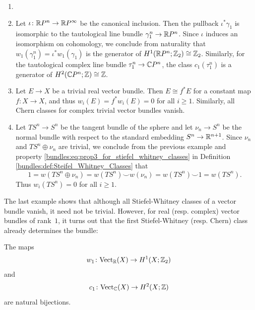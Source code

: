 \begin{example}
    \label{bundles:ex:characteristic_classes}
    \begin{enumerate}[label=(\roman*)]
        \item[]
        \item \vspace{-.5em} \label{bundles:ex:characteristic_classes_part1} Let $\iota \colon \mathbb{R} P^n \to \mathbb{R} P^\infty$ be the canonical inclusion. Then the pullback $\iota^\ast \gamma_1$ is isomorphic to the tautological line bundle $\gamma_1^n \to \mathbb{R} P^n$. Since $\iota$ induces an isomorphism on cohomology, we conclude from naturality that $w_1(\gamma_1^n) = \iota^\ast w_1(\gamma_1)$ is the generator of $H^1(\mathbb{R} P^n;\mathbb{Z}_2) \cong \mathbb{Z}_2$. Similarly, for the tautological complex line bundle $\tau_1^n \to \mathbb{C} P^n$, the class $c_1(\tau_1^n)$ is a generator of $H^2(\mathbb{C} P^n;\mathbb{Z}) \cong \mathbb{Z}$.
        \item Let $E \to X$ be a trivial real vector bundle. Then $E \cong f^\ast E$ for a constant map $f \colon X \to X$, and thus $w_i(E) = f^\ast w_i(E) = 0$ for all $i \geq 1$. Similarly, all Chern classes for complex trivial vector bundles vanish.
        \item \label{bundles:ex:characteristic_classes_part3} Let $TS^n \to S^n$ be the tangent bundle of the sphere and let $\nu_n \to S^n$ be the normal bundle with respect to the standard embedding $S^n \to \mathbb{R}^{n+1}$. Since $\nu_n$ and $TS^n \oplus \nu_n$ are trivial, we conclude from the previous example and property \ref{bundles:eq:prop3_for_stiefel_whitney_classes} in Definition \ref{bundles:def:Steifel_Whitney_Classes} that 
        \[
        1 = w(TS^n \oplus \nu_n) = w(TS^n) \smile w(\nu_n) = w(TS^n) \smile 1 = w(TS^n).
        \]
        Thus $w_i(TS^n) = 0$ for all $i \geq 1$.
    \end{enumerate}
\end{example}

The last example shows that although all Stiefel-Whitney classes of a vector bundle vanish, it need not be trivial. However, for real (resp. complex) vector bundles of rank~$1$, it turns out that the first Stiefel-Whitney (resp. Chern) class already determines the bundle:

\begin{proposition}
    \label{bundles:thm:line_bundles_determined_by_chern_class}
    The maps 
    $$w_1 \colon \mathrm{Vect}_{\mathbb{R}}(X) \to H^1(X;\mathbb{Z}_2)$$ 
    and 
    $$c_1 \colon \mathrm{Vect}_{\mathbb{C}}(X) \to H^2(X;\mathbb{Z})$$ 
    are natural bijections. 
\end{proposition}


